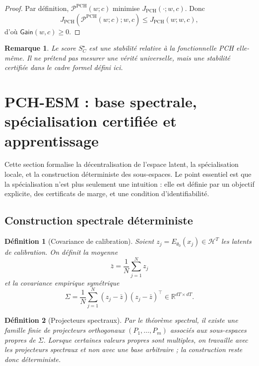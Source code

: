 \documentclass[11pt,a4paper]{article}
\newtheorem{definition}{Définition}[section]
\newtheorem{remark}{Remarque}[section]
\newcommand{\Hh}{\mathcal H}
\newcommand{\R}{\mathbb R}
\newcommand{\Pcal}{\mathcal P}
\newcommand{\1}{\mathbf 1}
\begin{document}
\begin{proof}
Par définition, \(\Pcal^{\mathrm{PCH}}(w;c)\) minimise \(J_{\mathrm{PCH}}(\cdot;w,c)\).  
Donc
\[
J_{\mathrm{PCH}}(\Pcal^{\mathrm{PCH}}(w;c);w,c)\le J_{\mathrm{PCH}}(w;w,c),
\]
d'où \(\mathsf{Gain}(w,c)\ge 0\).
\end{proof}

\begin{remark}
Le score \(S_C^\star\) est une stabilité relative à la fonctionnelle PCH elle-même.  
Il ne prétend pas mesurer une vérité universelle, mais une stabilité certifiée dans le cadre formel défini ici.
\end{remark}

\section{PCH-ESM : base spectrale, spécialisation certifiée et apprentissage}

Cette section formalise la décentralisation de l'espace latent, la spécialisation locale, et la construction déterministe des sous-espaces.  
Le point essentiel est que la spécialisation n'est plus seulement une intuition : elle est définie par un objectif explicite, des certificats de marge, et une condition d'identifiabilité.

\subsection{Construction spectrale déterministe}

\begin{definition}[Covariance de calibration]
Soient \(z_j=E_{\theta_0}(x_j)\in\Hh^T\) les latents de calibration.  
On définit la moyenne
\[
\bar z=\frac1N\sum_{j=1}^N z_j
\]
et la covariance empirique symétrique
\[
\Sigma=\frac1N\sum_{j=1}^N (z_j-\bar z)(z_j-\bar z)^\top\in\R^{dT\times dT}.
\]
\end{definition}

\begin{definition}[Projecteurs spectraux]
Par le théorème spectral, il existe une famille finie de projecteurs orthogonaux \((P_1,\dots,P_m)\) associés aux sous-espaces propres de \(\Sigma\).  
Lorsque certaines valeurs propres sont multiples, on travaille avec les projecteurs spectraux et non avec une base arbitraire ; la construction reste donc déterministe.
\end{definition}
\end{document}
